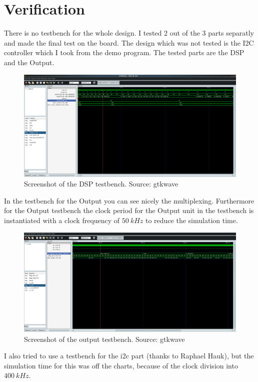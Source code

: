 \section{Verification}
There is no testbench for the whole design. I tested 2 out of the 3 parts separatly and made the final test
on the board. The design which was not tested is the I2C controller which I took from the demo program.
The tested parts are the DSP and the Output.

\begin{figure}[ht!]
	\centering
	\includegraphics[width=16cm]{fig/DSPtb}
	\caption{Screenshot of the DSP testbench. Source: gtkwave}
\end{figure}

In the testbench for the Output you can see nicely the multiplexing. Furthermore for the Output
testbench the clock period for the Output unit in the testbench is instantiated with a clock frequency of
$50~kHz$ to reduce the simulation time.
\begin{figure}[ht!]
	\centering
	\includegraphics[width=16cm]{fig/OUTtb}
	\caption{Screenshot of the output testbench. Source: gtkwave}
\end{figure}

I also tried to use a testbench for the i2c part (thanks to Raphael Hauk), but the simulation time for this was off the charts,
because of the clock division into $400~kHz$.

